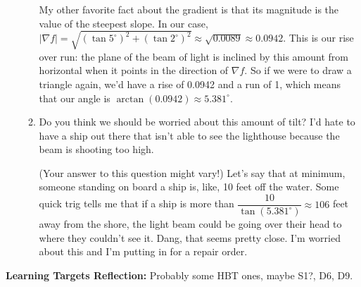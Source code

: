 \documentclass[10pt]{article}
\newcommand\del\nabla
\newenvironment{red}{\color{red}}{\ignorespacesafterend}
\begin{document}
\begin{enumerate}[leftmargin=0pt]
\begin{enumerate}
        \begin{red}
        My other favorite fact about the gradient is that its magnitude is the value of the steepest slope. In our case, $|\del f| = \sqrt{(\tan 5^\circ)^2 + (\tan 2^\circ)^2} \approx \sqrt{0.0089} \approx 0.0942.$ This is our rise over run: the plane of the beam of light is inclined by this amount from horizontal when it points in the direction of $\del f$. So if we were to draw a triangle again, we'd have a rise of 0.0942 and a run of 1, which means that our angle is $\arctan(0.0942) \approx 5.381^\circ.$
        \end{red}
        \item Do you think we should be worried about this amount of tilt? I'd hate to have a ship out there that isn't able to see the lighthouse because the beam is shooting too high.
        
        \begin{red}
        (Your answer to this question might vary!) Let's say that at minimum, someone standing on board a ship is, like, 10 feet off the water. Some quick trig tells me that if a ship is more than $\dfrac{10}{\tan(5.381^\circ)} \approx 106$ feet away from the shore, the light beam could be going over their head to where they couldn't see it. Dang, that seems pretty close. I'm worried about this and I'm putting in for a repair order.
        \end{red}
    \end{enumerate}
    \end{enumerate}

\begin{red}
\textbf{Learning Targets Reflection:} Probably some HBT ones, maybe S1?, D6, D9.
\end{red}
\end{document}
